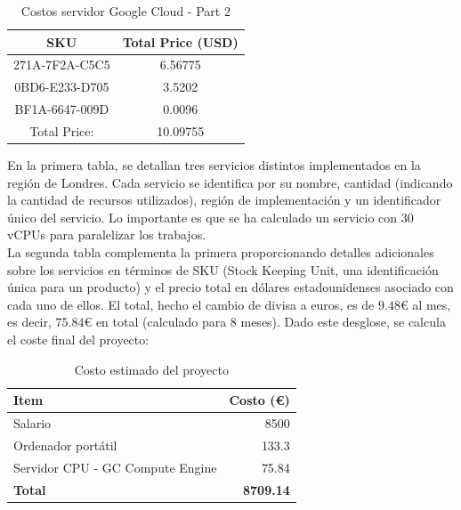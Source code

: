 \begin{table}[htp]
      \centering
      \begin{tabular}{|c|c|}
            \hline
            \textbf{SKU}   & \textbf{Total Price (USD)} \\
            \hline
            271A-7F2A-C5C5 & 6.56775                    \\
            0BD6-E233-D705 & 3.5202                     \\
            BF1A-6647-009D & 0.0096                     \\
            \hline
            Total Price:   & 10.09755                   \\
            \hline
      \end{tabular}
      \caption{Costos servidor Google Cloud - Part 2}
      \label{tab:server_costs_part2}
\end{table}
En la primera tabla, se detallan tres servicios distintos implementados en la región de Londres. Cada servicio se identifica por su nombre, cantidad (indicando la cantidad de recursos utilizados), región de implementación y un identificador único del servicio. Lo importante es que se ha calculado un servicio con $30$ vCPUs para paralelizar los trabajos.\\[6pt]

La segunda tabla complementa la primera proporcionando detalles adicionales sobre los servicios en términos de SKU (Stock Keeping Unit, una identificación única para un producto) y el precio total en dólares estadounidenses asociado con cada uno de ellos. El total, hecho el cambio de divisa a euros, es de $9.48$€ al mes, es decir, $75.84$€ en total (calculado para 8 meses).
Dado este desglose, se calcula el coste final del proyecto:
\begin{table}[htp]
      \centering
      \begin{tabular}{|l|r|}
            \hline
            \textbf{Item}                    & \textbf{Costo (€)} \\ \hline
            Salario                          & 8500             \\
            Ordenador portátil               & 133.3              \\
            Servidor CPU - GC Compute Engine & 75.84              \\
            \textbf{Total}                   & \textbf{8709.14} \\ \hline
      \end{tabular}
      \caption{Costo estimado del proyecto}
      \label{tab:proyect_budget}
\end{table}